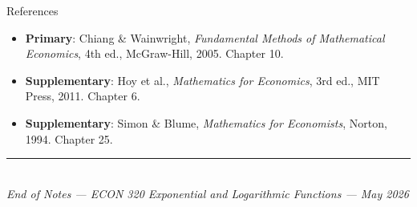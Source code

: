 \documentclass[12pt, a4paper]{article}
\theoremstyle{definition}
\begin{document}
\begin{keybox}{References}
\begin{itemize}
  \item \textbf{Primary}: Chiang \& Wainwright,
    \textit{Fundamental Methods of Mathematical Economics}, 4th ed.,
    McGraw-Hill, 2005. Chapter 10.
  \item \textbf{Supplementary}: Hoy et al.,
    \textit{Mathematics for Economics}, 3rd ed., MIT Press, 2011.
    Chapter 6.
  \item \textbf{Supplementary}: Simon \& Blume,
    \textit{Mathematics for Economists}, Norton, 1994. Chapter 25.
\end{itemize}
\end{keybox}

\vspace{1cm}
\begin{center}
  \textcolor{slate}{\rule{0.5\linewidth}{0.5pt}}\\[6pt]
  \textcolor{slate}{\small\itshape
    End of Notes --- ECON 320 Exponential and Logarithmic Functions
    --- May 2026}
\end{center}
\end{document}
